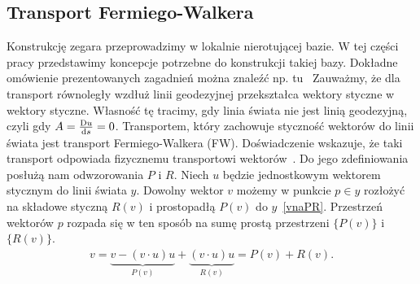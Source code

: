 \subsection{Transport Fermiego-Walkera}
Konstrukcję zegara przeprowadzimy w lokalnie nierotującej bazie. W tej części
pracy przedstawimy koncepcje potrzebne do konstrukcji takiej bazy. Dokładne 
omówienie prezentowanych zagadnień można znaleźć np. 
tu~\cite{synge1960, FWframesconstruct}
Zauważmy, że dla transport równoległy wzdłuż linii geodezyjnej
przekształca wektory styczne w wektory styczne. Własność tę 
tracimy, gdy linia świata nie jest linią geodezyjną, czyli
gdy $A = \frac{\text{D} u}{\text{d} s} = 0$. Transportem, który zachowuje styczność 
wektorów do linii świata jest transport Fermiego-Walkera (FW).
Doświadczenie wskazuje, że taki transport odpowiada 
fizycznemu transportowi wektorów~\cite{Costa2015, Ashtekar20141}.
Do jego zdefiniowania posłużą nam odwzorowania $P$ i $R$.
Niech $u$ będzie jednostkowym
wektorem stycznym do linii świata $y$. Dowolny wektor $v$ możemy w punkcie 
$p\in y$ rozłożyć na składowe styczną $R(v)$ i prostopadłą $P(v)$ 
do $y$~\eqref{vnaPR}. Przestrzeń wektorów $p$ rozpada się w ten sposób 
na sumę prostą przestrzeni $\{P(v)\}$ i $\{R(v)\}$.
\begin{align}\label{vnaPR}
v = \underbrace{v - (v\cdot u) u}_{P(v)} + 
\underbrace{(v\cdot u)u}_{R(v)} = P(v) + R(v).
\end{align}

